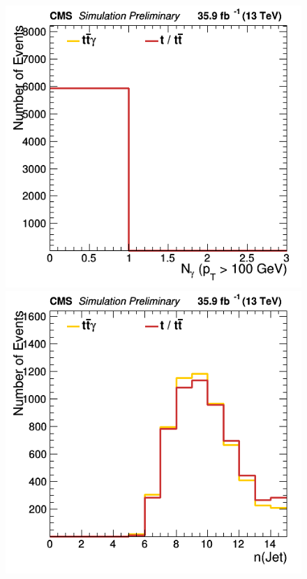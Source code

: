 \documentclass[11pt]{scrartcl}
\begin{document}
	\begin{figure}[H]
	\centering
	\begin{minipage}{.5\textwidth}
	  \centering
	  \includegraphics[width=0.7\linewidth]{figures/Notused/nHighPTPhotons.png}
	\end{minipage}%
	\begin{minipage}{.5\textwidth}
	  \centering
	  \includegraphics[width=0.7\linewidth]{figures/Notused/nJet.png}
	\end{minipage}
	\end{figure}
	
\end{document}
